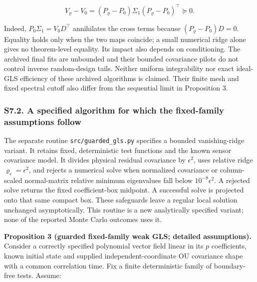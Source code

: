 \documentclass[
  american,
  11pt,
]{article}
\newcounter{none} %
\begin{document}
\[
V_\varrho-V_0=(P_\varrho-P_0)\Sigma_1(P_\varrho-P_0)^\top\succeq0.
\]

Indeed, \(P_0\Sigma_1=V_0D^\top\) annihilates the cross terms because
\((P_\varrho-P_0)D=0\). Equality holds only when the two maps coincide;
a small numerical ridge alone gives no theorem-level equality. Its
impact also depends on conditioning. The archived final fits are
unbounded and their bounded covariance pilots do not control inverse
random-design tails. Neither uniform integrability nor exact ideal-GLS
efficiency of these archived algorithms is claimed. Their finite mesh
and fixed spectral cutoff also differ from the sequential limit in
Proposition 3.

\subsubsection{S7.2. A specified algorithm for which the fixed-family
assumptions
follow}\label{s7.2.-a-specified-algorithm-for-which-the-fixed-family-assumptions-follow}

The separate routine \texttt{src/guarded\_gls.py} specifies a bounded
vanishing-ridge variant. It retains fixed, deterministic test functions
and the known sensor covariance model. It divides physical residual
covariance by \(\epsilon^2\), uses relative ridge
\(\varrho_\epsilon=\epsilon^2\), and rejects a numerical solve when
normalized covariance or column-scaled normal-matrix relative minimum
eigenvalues fall below \(10^{-8}\epsilon^2\). A rejected solve returns
the fixed coefficient-box midpoint. A successful solve is projected onto
that same compact box. These safeguards leave a regular local solution
unchanged asymptotically. This routine is a new analytically specified
variant; none of the reported Monte Carlo outcomes uses it.

\textbf{Proposition 3 (guarded fixed-family weak GLS; detailed
assumptions).} Consider a correctly specified polynomial vector field
linear in its \(p\) coefficients, known initial state and supplied
independent-coordinate OU covariance shape with a common correlation
time. Fix a finite deterministic family of boundary-free tests. Assume:
\end{document}
